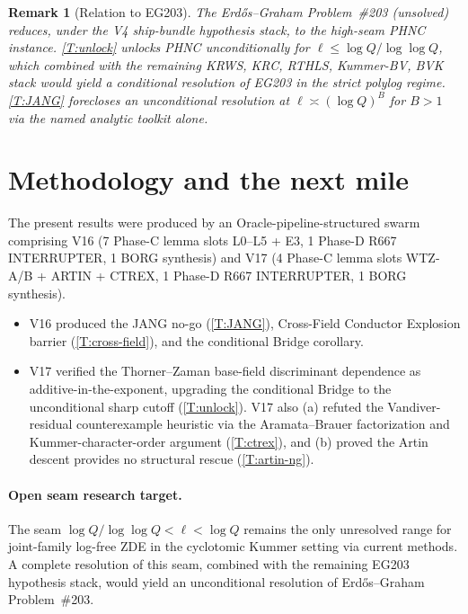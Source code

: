 \documentclass[11pt]{article}
\newtheorem{remark}{Remark}
\begin{document}
\begin{remark}[Relation to EG203]
The Erd\H{o}s--Graham Problem~\#203 (unsolved) reduces, under the V4 ship-bundle hypothesis stack, to the high-seam PHNC instance.  \cref{T:unlock} unlocks PHNC unconditionally for $\ell\le\log Q/\log\log Q$, which combined with the remaining {KRWS, KRC, RTHLS, Kummer-BV, BVK} stack would yield a conditional resolution of EG203 in the strict polylog regime.  \cref{T:JANG} forecloses an unconditional resolution at $\ell\asymp(\log Q)^B$ for $B>1$ via the named analytic toolkit alone.
\end{remark}

\section{Methodology and the next mile}\label{S:methodology}

The present results were produced by an Oracle-pipeline-structured swarm comprising V16 (7 Phase-C lemma slots L0--L5 + E3, 1 Phase-D R667 INTERRUPTER, 1 BORG synthesis) and V17 (4 Phase-C lemma slots WTZ-A/B + ARTIN + CTREX, 1 Phase-D R667 INTERRUPTER, 1 BORG synthesis).

\begin{itemize}[leftmargin=2em]
\item V16 produced the JANG no-go (\cref{T:JANG}), Cross-Field Conductor Explosion barrier (\cref{T:cross-field}), and the conditional Bridge corollary.

\item V17 verified the Thorner--Zaman base-field discriminant dependence as additive-in-the-exponent, upgrading the conditional Bridge to the unconditional sharp cutoff (\cref{T:unlock}).  V17 also (a) refuted the Vandiver-residual counterexample heuristic via the Aramata--Brauer factorization and Kummer-character-order argument (\cref{T:ctrex}), and (b) proved the Artin descent provides no structural rescue (\cref{T:artin-ng}).
\end{itemize}

\paragraph{Open seam research target.}  The seam $\log Q/\log\log Q<\ell<\log Q$ remains the only unresolved range for joint-family log-free ZDE in the cyclotomic Kummer setting via current methods.  A complete resolution of this seam, combined with the remaining EG203 hypothesis stack, would yield an unconditional resolution of Erd\H{o}s--Graham Problem~\#203.
\end{document}

